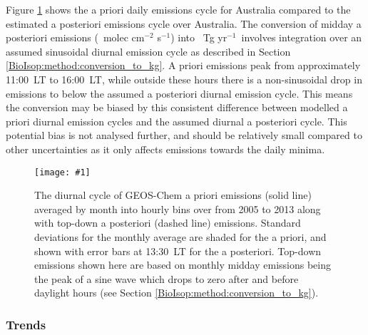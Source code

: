 \documentclass[acp, manuscript]{copernicus}
\newcommand{\tgpyr}{~Tg yr$^{-1}$}
\newcommand{\moleccms}{~molec cm$^{-2}$ s$^{-1}$}
\newcommand{\mypic}[3]{%
  \begin{figure}
    \texttt{[image: \#1]}
    \caption{#2}
    #3
  \end{figure}
}
\begin{document}
      Figure \ref{BioIsop:method:scaled:fig_megan_diurnal} shows the a priori daily emissions cycle for Australia compared to the estimated a posteriori emissions cycle over Australia.
      The conversion of midday a posteriori emissions (\moleccms) into \tgpyr ~involves integration over an assumed sinusoidal diurnal emission cycle as described in Section \ref{BioIsop:method:conversion_to_kg}.
      A priori emissions peak from approximately 11:00~LT to 16:00~LT, while outside these hours there is a non-sinusoidal drop in emissions to below the assumed a posteriori diurnal emission cycle.
      This means the conversion may be biased by this consistent difference between modelled a priori diurnal emission cycles and the assumed diurnal a posteriori cycle.
      This potential bias is not analysed further, and should be relatively small compared to other uncertainties as it only affects emissions towards the daily minima.
      
      \mypic{Figures/Emiss/MEGAN_monthly_daycycle_final.png}{ %
        The diurnal cycle of GEOS-Chem a priori emissions (solid line) averaged by month into hourly bins over from 2005 to 2013 along with top-down a posteriori (dashed line) emissions.
        Standard deviations for the monthly average are shaded for the a priori, and shown with error bars at 13:30~LT for the a posteriori.
        Top-down emissions shown here are based on monthly midday emissions being the peak of a sine wave which drops to zero after and before daylight hours (see Section \ref{BioIsop:method:conversion_to_kg}).
      }{\label{BioIsop:method:scaled:fig_megan_diurnal}}
    

    \subsubsection{Trends}
    
\end{document}
